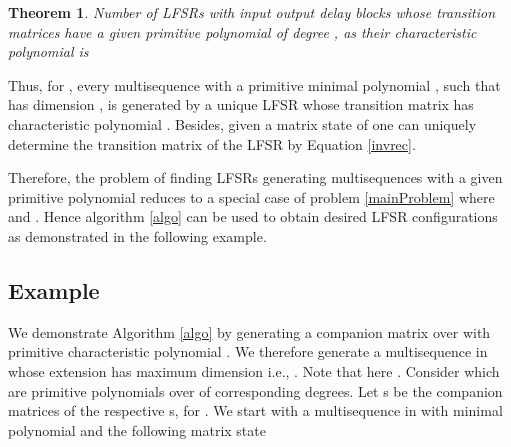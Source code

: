 \documentclass[letterpaper, 12 pt]{article}  \usepackage{amssymb}
\newtheorem{theorem}{Theorem}[section]
\begin{document}
\begin{theorem}
Number of LFSRs with input output delay blocks whose transition
matrices have a given primitive polynomial  of degree , as their
characteristic polynomial is

\end{theorem}

Thus, for , every
multisequence  with a primitive minimal polynomial , such that 
has dimension , is generated by a unique LFSR whose transition matrix
has characteristic polynomial . Besides, given a matrix state of
  one can uniquely determine the transition
matrix  of the LFSR by Equation \eqref{invrec}.

Therefore, the problem of finding LFSRs generating multisequences with a given
primitive polynomial reduces to a special case of problem \ref{mainProblem}
where  and . Hence algorithm
\ref{algo} can be used to obtain desired LFSR configurations as demonstrated in
the following example.

\subsection{Example}
We demonstrate Algorithm \ref{algo} by generating a companion matrix over  with primitive characteristic polynomial . We therefore generate a multisequence in  whose
extension has maximum dimension i.e., . Note that here . Consider
 which are primitive polynomials over  of corresponding degrees. Let s be the companion matrices of the respective s, for . 
We start with a multisequence in  with minimal polynomial  and the following matrix state
\end{document}

